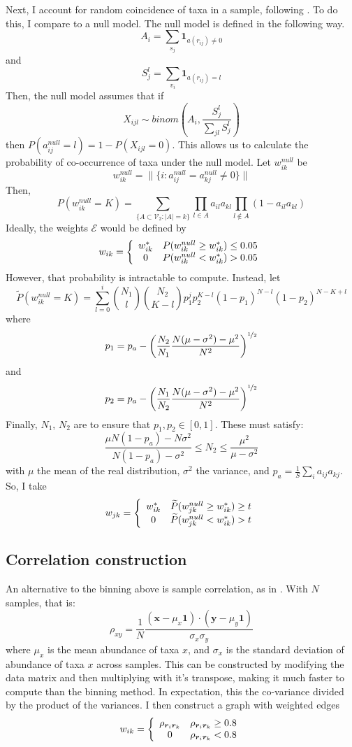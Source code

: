 \documentclass[10pt]{article}
\theoremstyle{definition}
\numberwithin{theorem}{section}
\numberwithin{definition}{section}
\numberwithin{lemma}{section}
\numberwithin{corollary}{section}
\numberwithin{clm}{section}
\numberwithin{rmk}{section}
\newcommand{\nhalf}{\nicefrac{1}{2}}
\renewcommand{\b}{\bm}
\newcommand{\cE}{\mathcal{E}}
\newcommand{\cV}{\mathcal{V}}
\begin{document}
Next, I account for random coincidence of taxa in a sample, following \cite{coocc}. To do this, I compare to a null model. The null model is defined in the following way.
\[
A_i= \sum_{s_j} \b{1}_{a(r_{ij}) \neq 0}
\] 
and 
\[
S_j^l  = \sum_{v_i} \b{1}_{a(r_{ij}) = l}
\]
Then, the null model assumes that if
\[
X_{ijl} \sim \mathit{binom}\left(A_i, \frac{S_j^l}{\sum_{jl} S_j^l}\right)
\]
then $P(a_{ij}^{null} = l) = 1-P(X_{ijl} = 0)$. This allows us to calculate the probability of co-occurrence of taxa under the null model. Let $w_{ik}^{null}$ be
\[
w^{null}_{ik} = \|\{i: a_{ij}^{null} = a_{kj}^{null} \neq 0\} \|
\]
Then,
\[
P(w_{ik}^{null} = K) =  \sum_{\{A \subset \cV_2:|A| = k\}} \prod_{l\in A} a_{il}a_{kl}\prod_{l \not\in A} (1- a_{il}a_{kl})
\]
Ideally, the weights $\cE$ would be defined by
\[
w_{ik} = \left\{ \begin{array}{c c}
w_{ik}^* & P(w_{ik}^{null} \geq w_{ik}^*) \leq 0.05\\
0 & P(w_{ik}^{null} < w_{ik}^*) > 0.05
\end{array}\right.
\]
However, that probability is intractable to compute. Instead, let
\[
\widetilde{P}(w_{ik}^{null} = K) = \sum_{l=0}^i \binom{N_1}{l}\binom{N_2}{K-l} p_1^j p_2^{K-l} (1-p_1)^{N-l}(1-p_2)^{N-K+l}
\]
where
\[
p_1 = p_a - \left(\frac{N_2}{N_1}\frac{N(\mu-\sigma^2)- \mu^2}{N^2}\right)^{\nhalf}
\]
and 
\[
p_2 = p_a - \left(\frac{N_1}{N_2}\frac{N(\mu-\sigma^2)- \mu^2}{N^2}\right)^{\nhalf}
\]
Finally, $N_1$, $N_2$ are to ensure that $p_1,p_2 \in [0,1]$. These must satisfy:
\[
\frac{\mu N (1-p_a) - N\sigma^2}{N(1-p_a)- \sigma^2} \leq N_2 \leq \frac{\mu^2}{\mu- \sigma^2}
\]
with $\mu$ the mean of the real distribution, $\sigma^2$ the variance, and $p_a = \frac{1}{S}\sum_{i} a_{ij}a_{kj}$. So, I take 
\[
w_{jk} = \left\{ \begin{array}{c c}
w_{ik}^* & \widetilde{P}(w_{jk}^{null} \geq w_{ik}^*) \geq t\\
0 & \widetilde{P}(w_{jk}^{null} < w_{ik}^*) > t
\end{array}\right.
\]

\subsection{Correlation construction}
An alternative to the binning above is sample correlation, as in \cite{gut}. With $N$ samples, that is:
\[
\rho_{xy} = \frac{1}{N}\frac{(\b{x}- \mu_x\b{1}) \cdot (\b{y} - \mu_y\b{1})}{\sigma_x \sigma_y}
\]
where $\mu_x$ is the mean abundance of taxa $x$, and $\sigma_x$ is the standard deviation of abundance of taxa $x$ across samples. This can be constructed by modifying the data matrix and then multiplying with it's transpose, making it much faster to compute than the binning method. In expectation, this the co-variance divided by the product of the variances. I then construct a graph with weighted edges
\[
w_{ik} = \left\{\begin{array}{c c}
\rho_{\b{r}_i\b{r}_k} & \rho_{\b{r}_i\b{r}_k}\geq 0.8\\
0 &  \rho_{\b{r}_i\b{r}_k}< 0.8
\end{array}\right.
\]
\end{document}
